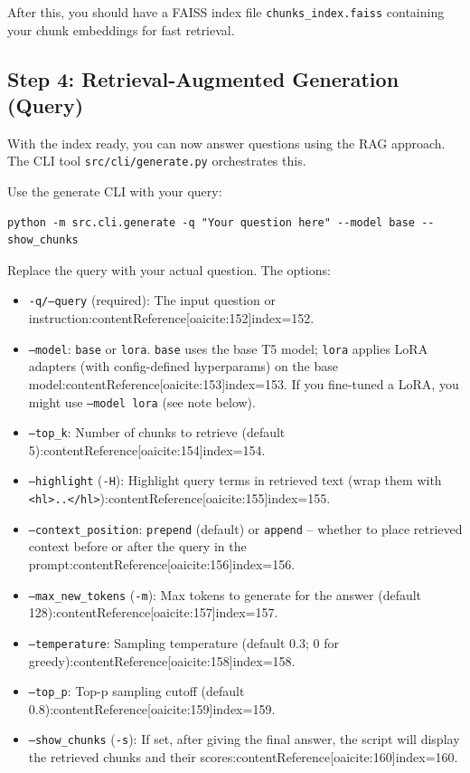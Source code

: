 \documentclass{article}
\begin{document}
After this, you should have a FAISS index file \texttt{chunks\_index.faiss} containing your chunk embeddings for fast retrieval.

\subsection{Step 4: Retrieval-Augmented Generation (Query)}
With the index ready, you can now answer questions using the RAG approach. The CLI tool \texttt{src/cli/generate.py} orchestrates this.

Use the generate CLI with your query:
\begin{verbatim}
python -m src.cli.generate -q "Your question here" --model base --show_chunks
\end{verbatim}

Replace the query with your actual question. The options:
\begin{itemize}
    \item \texttt{-q/--query} (required): The input question or instruction:contentReference[oaicite:152]{index=152}.
    \item \texttt{--model}: \texttt{base} or \texttt{lora}. \texttt{base} uses the base T5 model; \texttt{lora} applies LoRA adapters (with config-defined hyperparams) on the base model:contentReference[oaicite:153]{index=153}. If you fine-tuned a LoRA, you might use \texttt{--model lora} (see note below).
    \item \texttt{--top\_k}: Number of chunks to retrieve (default 5):contentReference[oaicite:154]{index=154}.
    \item \texttt{--highlight} (\texttt{-H}): Highlight query terms in retrieved text (wrap them with \texttt{<hl>..</hl>}):contentReference[oaicite:155]{index=155}.
    \item \texttt{--context\_position}: \texttt{prepend} (default) or \texttt{append} – whether to place retrieved context before or after the query in the prompt:contentReference[oaicite:156]{index=156}.
    \item \texttt{--max\_new\_tokens} (\texttt{-m}): Max tokens to generate for the answer (default 128):contentReference[oaicite:157]{index=157}.
    \item \texttt{--temperature}: Sampling temperature (default 0.3; 0 for greedy):contentReference[oaicite:158]{index=158}.
    \item \texttt{--top\_p}: Top-p sampling cutoff (default 0.8):contentReference[oaicite:159]{index=159}.
    \item \texttt{--show\_chunks} (\texttt{-s}): If set, after giving the final answer, the script will display the retrieved chunks and their scores:contentReference[oaicite:160]{index=160}.
\end{itemize}
\end{document}
